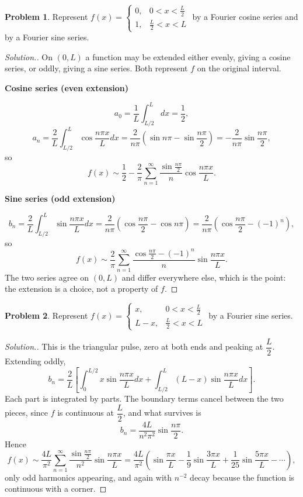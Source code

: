 \documentclass[11pt,a4paper]{article}
\theoremstyle{definition}
\newtheorem{problemx}{Problem}[subsection]
\newenvironment{problem}{\begin{problemx}}{\end{problemx}}
\newenvironment{solution}
  {\renewcommand{\qedsymbol}{}\begin{proof}[\textit{Solution}.]}
  {\end{proof}}
\newcommand{\subhead}[1]{%
  \par\medskip\noindent\textbf{#1}\par\nobreak\smallskip}
\begin{document}
\begin{problem}
Represent $f(x) = \begin{cases}0, & 0<x<\frac L2\\ 1, & \frac L2<x<L\end{cases}$
by a Fourier cosine series and by a Fourier sine series.
\end{problem}
\begin{solution}
On $(0,L)$ a function may be extended either evenly, giving a cosine series, or
oddly, giving a sine series. Both represent $f$ on the original interval.

\subhead{Cosine series (even extension)}
\[a_0 = \frac1L\int_{L/2}^{L}dx = \frac12 ,\]
\[a_n = \frac2L\int_{L/2}^{L}\cos\frac{n\pi x}{L}dx
= \frac{2}{n\pi}\left(\sin n\pi - \sin\frac{n\pi}{2}\right)
= -\frac{2}{n\pi}\sin\frac{n\pi}{2},\]
so
\[f(x)\sim\frac12 - \frac{2}{\pi}\sum_{n=1}^{\infty}
\frac{\sin\frac{n\pi}{2}}{n}\cos\frac{n\pi x}{L}.\]

\subhead{Sine series (odd extension)}
\[b_n = \frac2L\int_{L/2}^{L}\sin\frac{n\pi x}{L}dx
= \frac{2}{n\pi}\left(\cos\frac{n\pi}{2} - \cos n\pi\right)
= \frac{2}{n\pi}\left(\cos\frac{n\pi}{2} - (-1)^n\right),\]
so
\[f(x)\sim\frac{2}{\pi}\sum_{n=1}^{\infty}
\frac{\cos\frac{n\pi}{2}-(-1)^n}{n}\sin\frac{n\pi x}{L}.\]
The two series agree on $(0,L)$ and differ everywhere else, which is the point:
the extension is a choice, not a property of $f$.
\end{solution}

\begin{problem}
Represent $f(x) = \begin{cases}x, & 0<x<\frac L2\\ L-x, & \frac L2<x<L\end{cases}$
by a Fourier sine series.
\end{problem}
\begin{solution}
This is the triangular pulse, zero at both ends and peaking at
$\dfrac L2$. Extending oddly,
\[b_n = \frac2L\left[\int_0^{L/2}x\sin\frac{n\pi x}{L}dx
+ \int_{L/2}^{L}(L-x)\sin\frac{n\pi x}{L}dx\right].\]
Each part is integrated by parts. The boundary terms cancel between the two
pieces, since $f$ is continuous at $\dfrac L2$, and what survives is
\[b_n = \frac{4L}{n^2\pi^2}\sin\frac{n\pi}{2}.\]
Hence
\[f(x)\sim\frac{4L}{\pi^2}\sum_{n=1}^{\infty}
\frac{\sin\frac{n\pi}{2}}{n^2}\sin\frac{n\pi x}{L}
= \frac{4L}{\pi^2}\left(\sin\frac{\pi x}{L}
- \frac19\sin\frac{3\pi x}{L} + \frac{1}{25}\sin\frac{5\pi x}{L}-\cdots\right),\]
only odd harmonics appearing, and again with $n^{-2}$ decay because the function
is continuous with a corner.
\end{solution}
\end{document}
